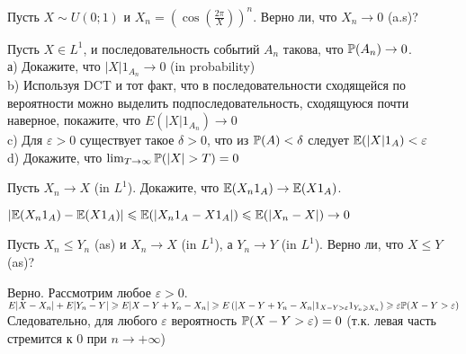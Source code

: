 \begin{solution}
\begin{solution}
\begin{solution}
\begin{solution}
\begin{problem}
Пусть $X\sim U(0;1)$ и $X_{n}=(\cos(\frac{2\pi}{X}))^{n}$. Верно
ли, что
$X_{n}\rightarrow 0$ (a.s)?
\end{problem} 
\begin{solution} 

\end{solution}

\begin{problem}
Пусть $X\in L^{1}$, и последовательность событий $A_{n}$ такова,
что $\P(A_{n})\rightarrow 0$. \\
а) Докажите, что $|X| 1_{A_{n}} \rightarrow 0$ (in probability) \\
b) Используя DCT и тот факт, что в последовательности сходящейся
по вероятности можно выделить подпоследовательность, сходящуюся
почти наверное, покажите, что $E\left(|X| 1_{A_{n}}\right)
\rightarrow 0$
\\
c) Для $\varepsilon>0$ существует такое $\delta>0$,
что из $\P(A)<\delta$ следует $\E(|X|1_{A})<\varepsilon$ \\
d) Докажите, что $\lim_{T\to\infty}\P(|X|>T)=0$ 
\end{problem} 
\begin{solution} 

\end{solution}

\begin{problem}
Пусть $X_{n}\rightarrow X$ (in $L^{1}$). Докажите, что
$\E(X_{n}1_{A})\rightarrow \E(X 1_{A})$. 
\end{problem} 
\begin{solution} 

$|\E(X_{n}1_{A})-\E(X 1_{A})|\le \E(|X_{n}1_{A}-X 1_{A}|)\le
\E(|X_{n}-X|)\rightarrow 0$ 
\end{solution}

\begin{problem}
Пусть $X_{n}\le Y_{n}$ (as) и $X_{n}\rightarrow X$ (in $L^{1}$), а
$Y_{n}\rightarrow Y$ (in $L^{1}$). Верно ли, что $X\le Y$ (as)? 
\end{problem} 
\begin{solution} 

Верно. Рассмотрим любое $\varepsilon>0$. \\
$E|X-X_{n}|+E|Y_{n}-Y|\ge E|X-Y+Y_{n}-X_{n}|\ge E\left(
|X-Y+Y_{n}-X_{n}| 1_{X-Y>\varepsilon}1_{Y_{n}\ge X_{n}}\right)\ge
\varepsilon \P(X-Y>\varepsilon)$ \\
Следовательно, для любого $\varepsilon$ вероятность
$\P(X-Y>\varepsilon)=0$ (т.к. левая часть стремится к 0 при
$n\rightarrow +\infty$) 
\end{solution}


\end{solution}
\end{solution}
\end{solution}
\end{solution}
